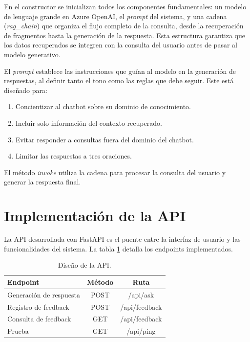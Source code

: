 En el constructor se inicializan todos los componentes fundamentales: un modelo de lenguaje grande en Azure OpenAI,
el \textit{prompt} del sistema, y una cadena (\textit{rag\_chain}) que organiza el flujo completo de la consulta, 
desde la recuperación de fragmentos hasta la generación de la respuesta. Esta estructura 
garantiza que los datos recuperados se integren con la consulta del usuario antes de pasar al modelo generativo.

El \textit{prompt} establece las instrucciones que guían al modelo en la generación de respuestas, al definir 
tanto el tono como las reglas que debe seguir. Este está diseñado para:

\begin{enumerate}
	\item Concientizar al chatbot sobre su dominio de conocimiento.
    \item Incluir solo información del contexto recuperado.
    \item Evitar responder a consultas fuera del dominio del chatbot.
    \item Limitar las respuestas a tres oraciones.
\end{enumerate}

El método \textit{invoke} utiliza la cadena para procesar la consulta del usuario y generar la respuesta final.

\section{Implementación de la API}

La API desarrollada con FastAPI es el puente entre la interfaz de usuario y las funcionalidades del sistema. La 
tabla \ref{tab:api} detalla los endpoints implementados.

\begin{table}[h]
	\centering
	\caption[Diseño de la API]{Diseño de la API.}
	\begin{tabular}{l c c}    
		\toprule
		\textbf{Endpoint} 	     & \textbf{Método} 	& \textbf{Ruta}  \\
		\midrule
		Generación de respuesta  &  POST 		    & /api/ask       \\		
		Registro de feedback     &  POST		    & /api/feedback  \\
		Consulta de feedback	 &  GET             & /api/feedback  \\
		Prueba                   &  GET             & /api/ping      \\
		\bottomrule
		\hline
	\end{tabular}
	\label{tab:api}
\end{table}

